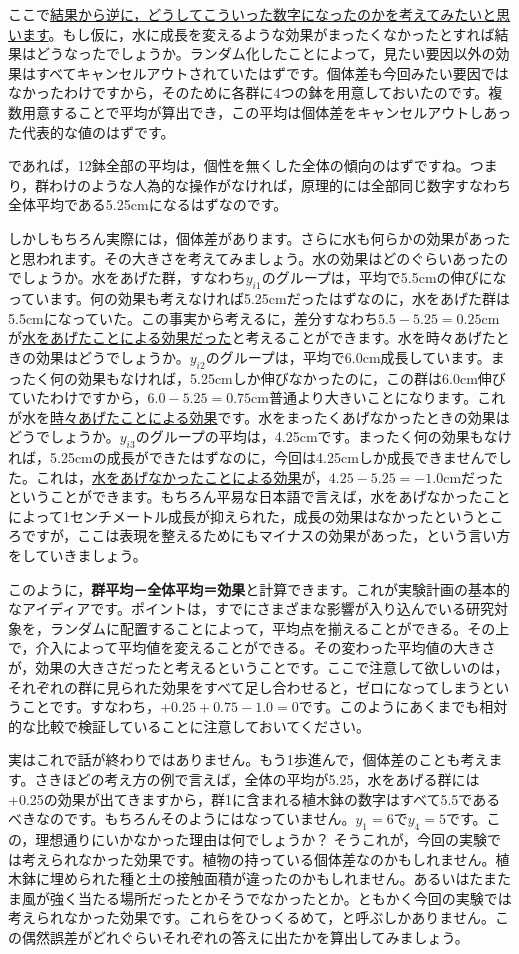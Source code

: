 \documentclass{ltjbook}
\begin{document}
ここで\underline{結果から逆に，どうしてこういった数字になったのかを考えてみたいと思います}。もし仮に，水に成長を変えるような効果がまったくなかったとすれば結果はどうなったでしょうか。ランダム化したことによって，見たい要因以外の効果はすべてキャンセルアウトされていたはずです。個体差も今回みたい要因ではなかったわけですから，そのために各群に4つの鉢を用意しておいたのです。複数用意することで平均が算出でき，この平均は個体差をキャンセルアウトしあった代表的な値のはずです。

であれば，12鉢全部の平均は，個性を無くした全体の傾向のはずですね。つまり，群わけのような人為的な操作がなければ，原理的には全部同じ数字すなわち全体平均である5.25cmになるはずなのです。

しかしもちろん実際には，個体差があります。さらに水も何らかの効果があったと思われます。その大きさを考えてみましょう。水の効果はどのぐらいあったのでしょうか。水をあげた群，すなわち$y_{i1}$のグループは，平均で5.5cmの伸びになっています。何の効果も考えなければ5.25cmだったはずなのに，水をあげた群は5.5cmになっていた。この事実から考えるに，差分すなわち$5.5-5.25=0.25$cmが\underline{水をあげたことによる効果だった}と考えることができます。水を時々あげたときの効果はどうでしょうか。$y_{i2}$のグループは，平均で6.0cm成長しています。まったく何の効果もなければ，5.25cmしか伸びなかったのに，この群は6.0cm伸びていたわけですから，$6.0-5.25=0.75$cm普通より大きいことになります。これが水を\underline{時々あげたことによる効果}です。水をまったくあげなかったときの効果はどうでしょうか。$y_{i3}$のグループの平均は，4.25cmです。まったく何の効果もなければ，5.25cmの成長ができたはずなのに，今回は4.25cmしか成長できませんでした。これは，\underline{水をあげなかったことによる効果}が，$4.25-5.25=-1.0$cmだったということができます。もちろん平易な日本語で言えば，水をあげなかったことによって1センチメートル成長が抑えられた，成長の効果はなかったというところですが，ここは表現を整えるためにもマイナスの効果があった，という言い方をしていきましょう。

このように，\textbf{群平均－全体平均＝効果}と計算できます。これが実験計画の基本的なアイディアです。ポイントは，すでにさまざまな影響が入り込んでいる研究対象を，ランダムに配置することによって，平均点を揃えることができる。その上で，介入によって平均値を変えることができる。その変わった平均値の大きさが，効果の大きさだったと考えるということです。ここで注意して欲しいのは，それぞれの群に見られた効果をすべて足し合わせると，ゼロになってしまうということです。すなわち，$+0.25+0.75-1.0=0$です。このようにあくまでも相対的な比較で検証していることに注意しておいてください。

実はこれで話が終わりではありません。もう1歩進んで，個体差のことも考えます。さきほどの考え方の例で言えば，全体の平均が5.25，水をあげる群には+0.25の効果が出てきますから，群1に含まれる植木鉢の数字はすべて5.5であるべきなのです。もちろんそのようにはなっていません。$y_{1} = 6$で$y_{4}=5$です。この，理想通りにいかなかった理由は何でしょうか？ そうこれが，今回の実験では考えられなかった効果です。植物の持っている個体差なのかもしれません。植木鉢に埋められた種と土の接触面積が違ったのかもしれません。あるいはたまたま風が強く当たる場所だったとかそうでなかったとか。ともかく今回の実験では考えられなかった効果です。これらをひっくるめて，と呼ぶしかありません。この偶然誤差がどれぐらいそれぞれの答えに出たかを算出してみましょう。
\end{document}
